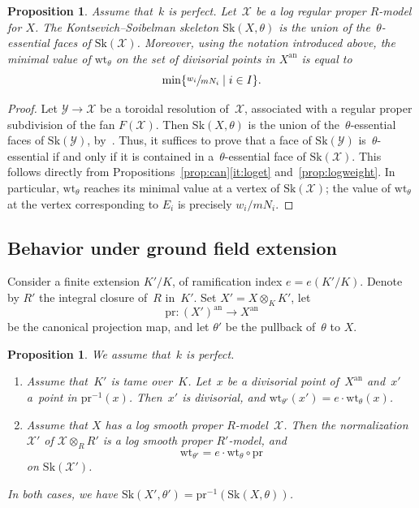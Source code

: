 \documentclass[JEP,XML,SOM,Unicode,NoFloatCountersInSection]{cedram}
\newtheorem{prop}[equation]{Proposition}
\theoremstyle{definition}
\numberwithin{equation}{subsection}
\newcommand{\cX}{\ensuremath{\mathscr{X}}}
\newcommand{\cY}{\ensuremath{\mathscr{Y}}}
\newcommand{\an}{\mathrm{an}}
\newcommand{\pr}{\mathrm{pr}}
\newcommand{\Sk}{\mathrm{Sk}}
\newcommand{\wt}{\mathrm{wt}}
\let\form\theta
\begin{document}
\begin{prop}\label{prop:sklogmodel}
Assume that~$k$ is perfect. Let~$\cX$ be a log regular proper $R$\nobreakdash-model for $X$.
The Kontsevich--Soibelman skeleton $\Sk(X,\form)$ is the union of the~$\form$-essential faces of $\Sk(\cX)$.
Moreover, using the notation introduced above, the minimal value of $\wt_{\form}$ on the set of divisorial points in $X^{\an}$ is equal to
\[
\min\{\sfrac{w_i}{mN_i}\mid i\in I\}.
\]
\end{prop}

\begin{proof}
Let $\cY\to \cX$ be a toroidal resolution of~$\cX$, associated with a regular proper subdivision of the fan $F(\cX)$.
Then $\Sk(X,\form)$ is the union of the~$\form$-essential faces of $\Sk(\cY)$, by~\cite[4.7.5]{MuNi}.
Thus, it suffices to prove that a face of $\Sk(\cY)$ is~$\form$-essential if and only if it is contained in a~$\form$-essential face of $\Sk(\cX)$.
This follows directly from Propositions~\ref{prop:can}\eqref{it:loget} and~\ref{prop:logweight}. In particular, $\wt_{\form}$ reaches its minimal value at a vertex of $\Sk(\cX)$; the value of $\wt_{\form}$ at the vertex corresponding to $E_i$ is precisely $w_i/mN_i$.
\end{proof}

\subsection{Behavior under ground field extension}
Consider a finite extension $K'/K$, of ramification index $e=e(K'/K)$. Denote by $R'$ the integral closure of~$R$ in~$K'$. Set $X'=X\otimes_KK'$, let
\begin{equation*}
\pr\colon (X')^{\an}\to X^{\an}
\end{equation*}
be the canonical projection map, and let $\form'$ be the pullback of~$\form$ to $X$.
\begin{prop}\label{prop:skbasech}
We assume that~$k$ is perfect.
\begin{enumerate}
\item \label{it:skbasech-tame} Assume that~$K'$ is tame over~$K$. Let~$x$ be a divisorial point of~$X^{\an}$ and~$x'$ a~point in $\pr^{-1}(x)$. Then~$x'$ is divisorial, and
$\wt_{\form'}(x')=e\cdot \wt_{\form}(x)$.
\item \label{it:skbasech-logsm} Assume that $X$ has a log smooth proper $R$\nobreakdash-model~$\cX$. Then the normalization~$\cX'$ of $\cX\otimes_R R'$ is a log smooth proper $R'$-model, and
\[
\wt_{\form'}=e\cdot \wt_{\form}\circ \pr
\]
on $\Sk(\cX')$.
\end{enumerate}
In both cases, we have $\Sk(X',\form')=\pr^{-1}(\Sk(X,\form))$.
\end{prop}
\end{document}
